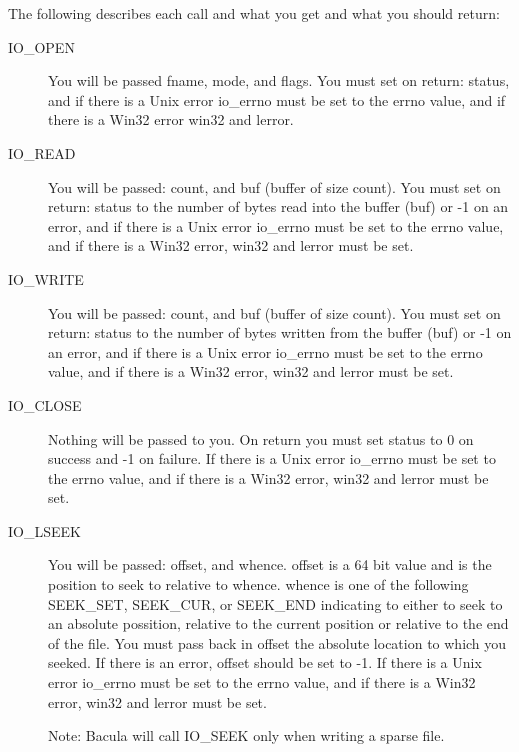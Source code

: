 The following describes each call and what you get and what you
should return:

\begin{description}
 \item [IO\_OPEN]
   You will be passed fname, mode, and flags.
   You must set on return: status, and if there is a Unix error
   io\_errno must be set to the errno value, and if there is a 
   Win32 error win32 and lerror. 

 \item [IO\_READ]
  You will be passed: count, and buf (buffer of size count).
  You must set on return: status to the number of bytes 
  read into the buffer (buf) or -1 on an error, 
  and if there is a Unix error
  io\_errno must be set to the errno value, and if there is a
  Win32 error, win32 and lerror must be set.

 \item [IO\_WRITE]
  You will be passed: count, and buf (buffer of size count).
  You must set on return: status to the number of bytes 
  written from the buffer (buf) or -1 on an error, 
  and if there is a Unix error
  io\_errno must be set to the errno value, and if there is a
  Win32 error, win32 and lerror must be set.

 \item [IO\_CLOSE]
  Nothing will be passed to you.  On return you must set 
  status to 0 on success and -1 on failure.  If there is a Unix error
  io\_errno must be set to the errno value, and if there is a
  Win32 error, win32 and lerror must be set.

 \item [IO\_LSEEK]
  You will be passed: offset, and whence. offset is a 64 bit value
  and is the position to seek to relative to whence.  whence is one
  of the following SEEK\_SET, SEEK\_CUR, or SEEK\_END indicating to
  either to seek to an absolute possition, relative to the current 
  position or relative to the end of the file.
  You must pass back in offset the absolute location to which you 
  seeked. If there is an error, offset should be set to -1.
  If there is a Unix error
  io\_errno must be set to the errno value, and if there is a
  Win32 error, win32 and lerror must be set.

  Note: Bacula will call IO\_SEEK only when writing a sparse file.
  
\end{description}

